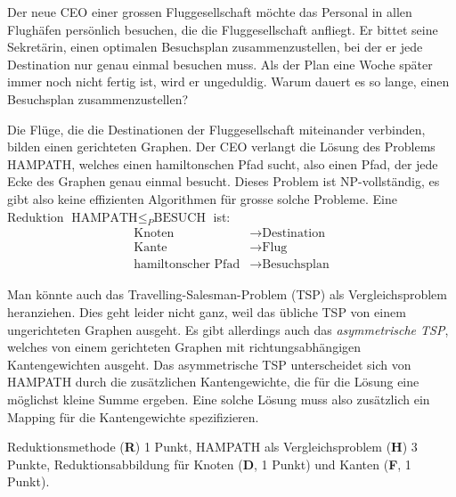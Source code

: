 Der neue CEO einer grossen Fluggesellschaft möchte das Personal in allen
Flughäfen persönlich besuchen, die die Fluggesellschaft anfliegt.
Er bittet seine Sekretärin, einen optimalen Besuchsplan zusammenzustellen,
bei der er jede Destination nur genau einmal besuchen muss.
Als der Plan eine Woche später immer noch nicht fertig ist, wird er
ungeduldig.
Warum dauert es so lange, einen Besuchsplan zusammenzustellen?

\begin{loesung}
Die Flüge, die die Destinationen der Fluggesellschaft miteinander
verbinden, bilden einen gerichteten Graphen.
Der CEO verlangt die Lösung des Problems HAMPATH, welches einen
hamiltonschen Pfad sucht, also einen Pfad, der jede Ecke des Graphen
genau einmal besucht.
Dieses Problem ist NP-vollständig, es gibt also keine effizienten
Algorithmen für grosse solche Probleme.
Eine Reduktion $\text{HAMPATH}\le_P\text{BESUCH}$ ist:
\begin{align*}
\text{Knoten}    & \to \text{Destination}\\
\text{Kante}     & \to \text{Flug} \\
\text{hamiltonscher Pfad}&\to\text{Besuchsplan}
\end{align*}
\end{loesung}

\begin{diskussion}
Man könnte auch das Travelling-Salesman-Problem (TSP) als Vergleichsproblem
heranziehen.
Dies geht leider nicht ganz, weil das übliche TSP von einem ungerichteten
Graphen ausgeht.
Es gibt allerdings auch das {\em asymmetrische TSP}, welches von einem 
gerichteten Graphen mit richtungsabhängigen Kantengewichten ausgeht.
Das asymmetrische TSP unterscheidet sich von HAMPATH durch die
zusätzlichen Kantengewichte, die für die Lösung eine möglichst
kleine Summe ergeben.
Eine solche Lösung muss also zusätzlich ein Mapping für die
Kantengewichte spezifizieren.
\end{diskussion}

\begin{bewertung}
Reduktionsmethode ({\bf R}) 1 Punkt,
HAMPATH als Vergleichsproblem ({\bf H}) 3 Punkte,
Reduktionsabbildung für Knoten ({\bf D}, 1 Punkt) und Kanten
({\bf F}, 1 Punkt).
\end{bewertung}

